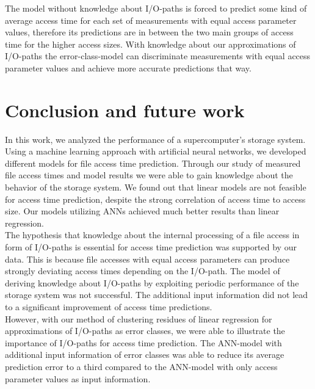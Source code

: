 \documentclass{superfri}
\begin{document}
The model without knowledge about I/O-paths is forced to predict some kind of average access time for each set of measurements with equal access parameter values, therefore its predictions are in between the two main groups of access time for the higher access sizes.
With knowledge about our approximations of I/O-paths the error-class-model can discriminate measurements with equal access parameter values and achieve more accurate predictions that way.

\section{Conclusion and future work}
\label{conclusion}
In this work, we analyzed the performance of a supercomputer's storage system.
Using a machine learning approach with artificial neural networks, we developed different models for file access time prediction.
Through our study of measured file access times and model results we were able to gain knowledge about the behavior of the storage system.
We found out that linear models are not feasible for access time prediction, despite the strong correlation of access time to access size.
Our models utilizing ANNs achieved much better results than linear regression.\\
The hypothesis that knowledge about the internal processing of a file access in form of I/O-paths is essential for access time prediction was supported by our data.
This is because file accesses with equal access parameters can produce strongly deviating access times depending on the I/O-path. 
The model of deriving knowledge about I/O-paths by exploiting periodic performance of the storage system was not successful.
The additional input information did not lead to a significant improvement of access time predictions.\\
However, with our method of clustering residues of linear regression for approximations of I/O-paths as error classes, we were able to illustrate the importance of I/O-paths for access time prediction. The ANN-model with additional input information of error classes was able to reduce its average prediction error to a third compared to the ANN-model with only access parameter values as input information.\medskip
\end{document}

